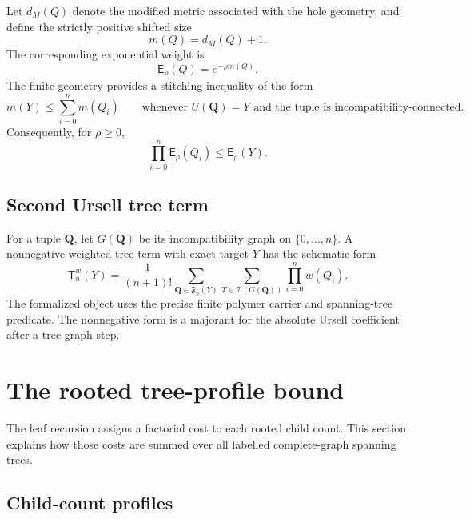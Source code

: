 \documentclass[11pt]{article}
\newcommand{\Tree}{\mathcal T}
\newcommand{\ExpW}{\mathsf E}
\newcommand{\TargetTerm}{\mathsf T}
\begin{document}
Let $d_M(Q)$ denote the modified metric associated with the hole geometry, and define the strictly positive shifted size
\begin{equation}\label{eq:m-def}
  m(Q)=d_M(Q)+1.
\end{equation}
The corresponding exponential weight is
\begin{equation}\label{eq:exp-weight}
  \ExpW_\rho(Q)=e^{-\rho m(Q)}.
\end{equation}
The finite geometry provides a stitching inequality of the form
\begin{equation}\label{eq:stitch}
  m(Y)\le \sum_{i=0}^{n}m(Q_i)
  \qquad
  \text{whenever }U(\mathbf Q)=Y
  \text{ and the tuple is incompatibility-connected.}
\end{equation}
Consequently, for $\rho\ge0$,
\begin{equation}\label{eq:stitch-exp}
  \prod_{i=0}^{n}\ExpW_\rho(Q_i)
  \le \ExpW_\rho(Y).
\end{equation}

\subsection{Second Ursell tree term}

For a tuple $\mathbf Q$, let $G(\mathbf Q)$ be its incompatibility graph on $\{0,\dots,n\}$.  A nonnegative weighted tree term with exact target $Y$ has the schematic form
\begin{equation}\label{eq:target-tree-term}
  \TargetTerm_n^w(Y)
  =\frac{1}{(n+1)!}
  \sum_{\mathbf Q\in\mathfrak F_n(Y)}
  \sum_{T\in\Tree(G(\mathbf Q))}
  \prod_{i=0}^{n}w(Q_i).
\end{equation}
The formalized object uses the precise finite polymer carrier and spanning-tree predicate.  The nonnegative form is a majorant for the absolute Ursell coefficient after a tree-graph step.

\section{The rooted tree-profile bound}

The leaf recursion assigns a factorial cost to each rooted child count.  This section explains how those costs are summed over all labelled complete-graph spanning trees.

\subsection{Child-count profiles}
\end{document}
